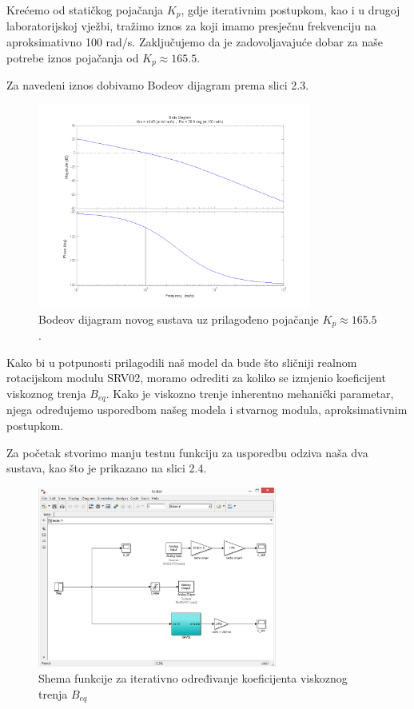 \documentclass[12pt,a4paper]{article}
\begin{document}
Krećemo od statičkog pojačanja $K_p$, gdje iterativnim postupkom, kao i u drugoj laboratorijskoj vježbi, tražimo iznos za koji imamo presječnu frekvenciju na aproksimativno 100 rad/s. Zaključujemo da je zadovoljavajuće dobar za naše potrebe iznos pojačanja od $K_p \approx 165.5$.

Za navedeni iznos dobivamo Bodeov dijagram prema slici 2.3.

\newpage
\begin{figure}[h]
	\begin{center}
	\includegraphics[width=0.8\textwidth]{bode_kp.png}
    \caption{Bodeov dijagram novog sustava uz prilagođeno pojačanje $K_p \approx 165.5$.}
    \end{center}
\end{figure}

Kako bi u potpunosti prilagodili naš model da bude što sličniji realnom rotacijskom modulu SRV02, moramo odrediti za koliko se izmjenio koeficijent viskoznog trenja $B_{eq}$. Kako je viskozno trenje inherentno mehanički parametar, njega određujemo usporedbom našeg modela i stvarnog modula, aproksimativnim postupkom.

Za početak stvorimo manju testnu funkciju za usporedbu odziva naša dva sustava, kao što je prikazano na slici 2.4.

\begin{figure}[h]
	\begin{center}
	\includegraphics[width=0.7\textwidth, height = 3.3 in]{tester.png}
    \caption{Shema funkcije za iterativno određivanje koeficijenta viskoznog trenja $B_{eq}$}
    \end{center}
\end{figure}
\end{document}
